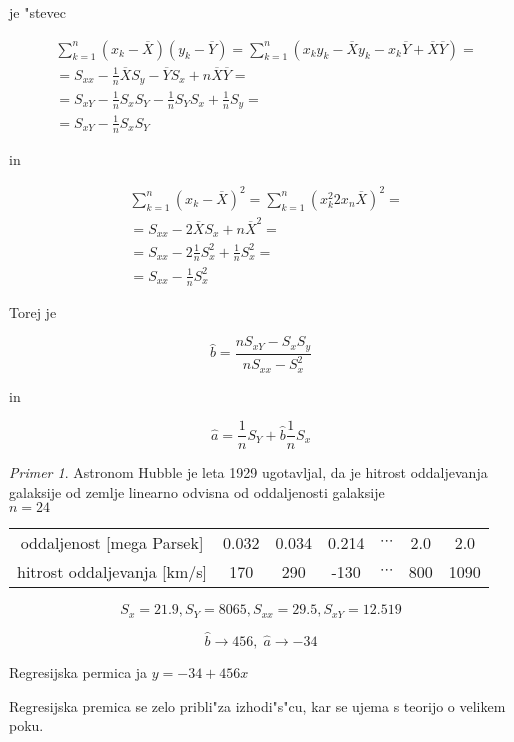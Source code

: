 \documentclass[a4paper,12pt]{article}
\theoremstyle{definition}
\theoremstyle{remark}
\newtheorem*{ex}{Primer}
\begin{document}
je "stevec

\begin{align*}
    &\sum_{k=1}^{n} (x_k - \overline{X}) (y_k - \overline{Y}) = \sum_{k=1}^{n} (x_k y_k - \overline{X} y_k - x_k \overline{Y}
        + \overline{X} \overline{Y}) = \\
    &= S_{xx} - \frac{1}{n} \overline{X} S_y - \overline{Y} S_x + n \overline{X} \overline{Y} = \\
    &= S_{xY} - \frac{1}{n} S_x S_Y - \frac{1}{n} S_Y S_x + \frac{1}{n} S_y = \\
    &= S_{xY} - \frac{1}{n} S_x S_Y
\end{align*}

in

\begin{align*}
    &\sum_{k=1}^{n} (x_k - \overline{X})^2 = \sum_{k=1}^{n} (x_k^2  2 x_n \overline{X})^2 = \\
    &= S_{xx} - 2 \overline{X} S_x + n \overline{X}^2 = \\
    &= S_{xx} - 2 \frac{1}{n} S_x^2 + \frac{1}{n} S_x^2 = \\
    &= S_{xx} - \frac{1}{n} S_x^2
\end{align*}

Torej je

\begin{equation*}
    \hat{b} = \frac{n S_{xY} - S_x S_y}{n S_{xx} - S_x^2}
\end{equation*}

in

\begin{equation*}
    \hat{a} = \frac{1}{n} S_Y + \hat{b} \frac{1}{n} S_x
\end{equation*}

\begin{ex}
    Astronom Hubble je leta 1929 ugotavljal, da je hitrost oddaljevanja galaksije od zemlje linearno odvisna od oddaljenosti galaksije \\
    $n = 24$

    \begin{center}
        \begin{tabular}{c | c c c c c c}
            \hline
            oddaljenost [mega Parsek] & 0.032 & 0.034 & 0.214 & $\cdots$ & 2.0 & 2.0 \\
            hitrost oddaljevanja [km/s] & 170 & 290 & -130 & $\cdots$ & 800 & 1090
        \end{tabular}
    \end{center}

    \begin{equation*}
        S_x = 21.9, S_Y = 8065, S_{xx} = 29.5, S_{xY} = 12.519
    \end{equation*}

    \begin{equation*}
        \hat{b} \to 456, \; \hat{a} \to -34
    \end{equation*}

    Regresijska permica ja $y = -34 + 456x$


    Regresijska premica se zelo pribli"za izhodi"s"cu, kar se ujema s teorijo o velikem poku.
\end{ex}
\end{document}
